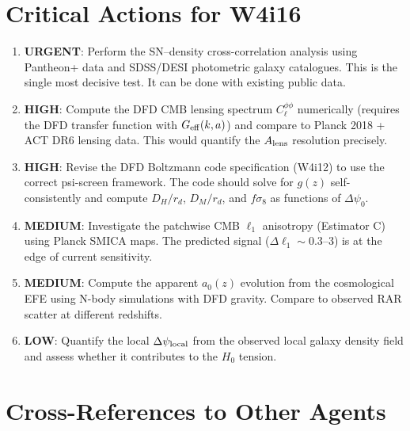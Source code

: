 \documentclass[11pt,a4paper]{article}
\newcommand{\Geff}{G_{\rm eff}}
\newcommand{\Dpsi}{\Delta\psi}
\begin{document}
\section{Critical Actions for W4i16}
\label{sec:actions}

\begin{enumerate}
\item \textbf{URGENT}: Perform the SN--density cross-correlation
  analysis using Pantheon+ data and SDSS/DESI photometric galaxy
  catalogues.  This is the single most decisive test.  It can be
  done with existing public data.

\item \textbf{HIGH}: Compute the DFD CMB lensing spectrum
  $C_\ell^{\phi\phi}$ numerically (requires the DFD transfer function
  with $\Geff(k,a)$) and compare to Planck 2018 + ACT DR6 lensing data.
  This would quantify the $A_{\rm lens}$ resolution precisely.

\item \textbf{HIGH}: Revise the DFD Boltzmann code specification
  (W4i12) to use the correct psi-screen framework.  The code should
  solve for $g(z)$ self-consistently and compute $D_H/r_d$,
  $D_M/r_d$, and $f\sigma_8$ as functions of $\Dpsi_0$.

\item \textbf{MEDIUM}: Investigate the patchwise CMB $\ell_1$
  anisotropy (Estimator C) using Planck SMICA maps.  The predicted
  signal ($\Delta\ell_1 \sim 0.3$--$3$) is at the edge of current
  sensitivity.

\item \textbf{MEDIUM}: Compute the apparent $a_0(z)$ evolution from
  the cosmological EFE using N-body simulations with DFD gravity.
  Compare to observed RAR scatter at different redshifts.

\item \textbf{LOW}: Quantify the local $\Dpsi_{\rm local}$ from
  the observed local galaxy density field and assess whether it
  contributes to the $H_0$ tension.
\end{enumerate}


\section{Cross-References to Other Agents}
\end{document}
